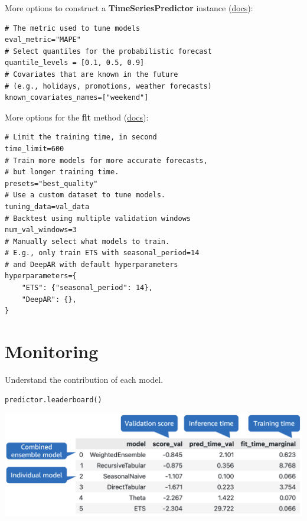 More options to construct a \textbf{TimeSeriesPredictor} instance (\href{https://auto.gluon.ai/stable/api/autogluon.timeseries.TimeSeriesPredictor.html}{docs}):

\begin{verbatim}
# The metric used to tune models
eval_metric="MAPE"
# Select quantiles for the probabilistic forecast
quantile_levels = [0.1, 0.5, 0.9]
# Covariates that are known in the future
# (e.g., holidays, promotions, weather forecasts)
known_covariates_names=["weekend"]
\end{verbatim}
More options for the \textbf{fit} method (\href{https://auto.gluon.ai/stable/api/autogluon.timeseries.TimeSeriesPredictor.fit.html}{docs}):

\begin{verbatim}
# Limit the training time, in second
time_limit=600
# Train more models for more accurate forecasts, 
# but longer training time.
presets="best_quality"
# Use a custom dataset to tune models.
tuning_data=val_data
# Backtest using multiple validation windows
num_val_windows=3
# Manually select what models to train.
# E.g., only train ETS with seasonal_period=14
# and DeepAR with default hyperparameters
hyperparameters={
    "ETS": {"seasonal_period": 14},
    "DeepAR": {},
}
\end{verbatim}



\section*{Monitoring}
Understand the contribution of each model.

\begin{verbatim}
predictor.leaderboard()
\end{verbatim}

\includegraphics[width=\linewidth]{timeseries/images/leaderboard.png}

